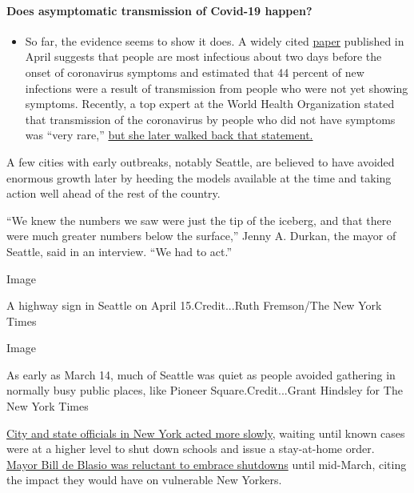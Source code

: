 \begin{itemize}
{  \paragraph{Does asymptomatic transmission of Covid-19
  happen?}\label{does-asymptomatic-transmission-of-covid-19-happen}}

  \begin{itemize}
  \tightlist
  \item
    So far, the evidence seems to show it does. A widely cited
    \href{https://www.nature.com/articles/s41591-020-0869-5}{paper}
    published in April suggests that people are most infectious about
    two days before the onset of coronavirus symptoms and estimated that
    44 percent of new infections were a result of transmission from
    people who were not yet showing symptoms. Recently, a top expert at
    the World Health Organization stated that transmission of the
    coronavirus by people who did not have symptoms was ``very rare,''
    \href{https://www.nytimes.com/2020/06/09/world/coronavirus-updates.html?action=click\&pgtype=Article\&state=default\&region=MAIN_CONTENT_3\&context=storylines_faq\#link-1f302e21}{but
    she later walked back that statement.}
  \end{itemize}
\end{itemize}

A few cities with early outbreaks, notably Seattle, are believed to have
avoided enormous growth later by heeding the models available at the
time and taking action well ahead of the rest of the country.

``We knew the numbers we saw were just the tip of the iceberg, and that
there were much greater numbers below the surface,'' Jenny A. Durkan,
the mayor of Seattle, said in an interview. ``We had to act.''

Image

A highway sign in Seattle on April 15.Credit...Ruth Fremson/The New York
Times

Image

As early as March 14, much of Seattle was quiet as people avoided
gathering in normally busy public places, like Pioneer
Square.Credit...Grant Hindsley for The New York Times

\href{https://www.nytimes.com/2020/04/08/nyregion/new-york-coronavirus-response-delays.html}{City
and state officials in New York acted more slowly}, waiting until known
cases were at a higher level to shut down schools and issue a
stay-at-home order.
\href{https://www.nytimes.com/2020/03/16/nyregion/coronavirus-bill-de-blasio.html}{Mayor
Bill de Blasio was reluctant to embrace shutdowns} until mid-March,
citing the impact they would have on vulnerable New Yorkers.


